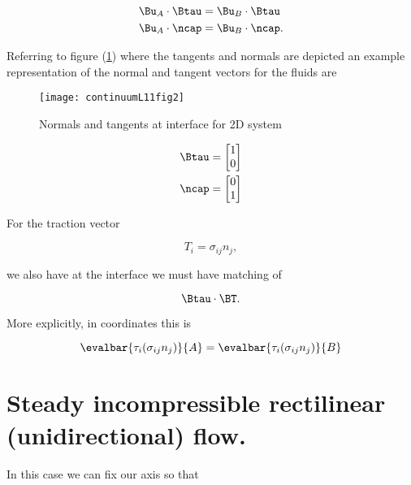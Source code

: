 \begin{align}\label{eqn:continuumL11:70}
\Bu_A \cdot \Btau &= \Bu_B \cdot \Btau \\
\Bu_A \cdot \ncap &= \Bu_B \cdot \ncap.
\end{align}

Referring to figure (\ref{fig:continuumL11:continuumL11fig2}) where the tangents and normals are depicted an example representation of the normal and tangent vectors for the fluids are

\begin{figure}[htp]
   \centering
   \texttt{[image: continuumL11fig2]}
   \caption{Normals and tangents at interface for 2D system}\label{fig:continuumL11:continuumL11fig2}
\end{figure}

\begin{align}\label{eqn:continuumL11:90}
\Btau &= 
\begin{bmatrix}
1 \\
0
\end{bmatrix} \\
\ncap &= 
\begin{bmatrix}
0 \\
1
\end{bmatrix} 
\end{align}

For the traction vector

\begin{equation}\label{eqn:continuumL11:110}
T_i = \sigma_{ij} n_j,
\end{equation}

we also have at the interface we must have matching of

\begin{equation}\label{eqn:continuumL11:130}
\Btau \cdot \BT.
\end{equation}

More explicitly, in coordinates this is

\begin{equation}\label{eqn:continuumL11:150}
\evalbar{\tau_i (\sigma_{ij} n_j)}{A} =
\evalbar{\tau_i (\sigma_{ij} n_j)}{B}
\end{equation}

\section{Steady incompressible rectilinear (unidirectional) flow.}

In this case we can fix our axis so that

